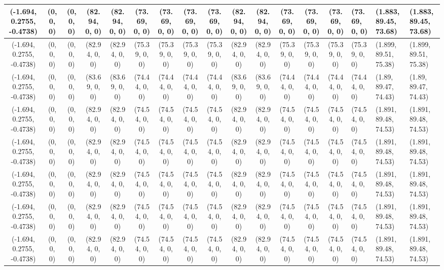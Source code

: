 \begin{tabular}{| c | c | c | c | c | c | c | c | c | c | c | c | c | c |}
	(-1.694, 0.2755, -0.4738) & (0, 0, 0) & (0, 0, 0) & (82.94, 0, 0) & (82.94, 0, 0) & (73.69, 0, 0) & (73.69, 0, 0) & (73.69, 0, 0) & (73.69, 0, 0) & (82.94, 0, 0) & (82.94, 0, 0) & (73.69, 0, 0) & (73.69, 0, 0) & (73.69, 0, 0) & (73.69, 0, 0) & (1.883, 89.45, 73.68) & (1.883, 89.45, 73.68) \\ \hline
	(-1.694, 0.2755, -0.4738) & (0, 0, 0) & (0, 0, 0) & (82.94, 0, 0) & (82.94, 0, 0) & (75.39, 0, 0) & (75.39, 0, 0) & (75.39, 0, 0) & (75.39, 0, 0) & (82.94, 0, 0) & (82.94, 0, 0) & (75.39, 0, 0) & (75.39, 0, 0) & (75.39, 0, 0) & (75.39, 0, 0) & (1.899, 89.51, 75.38) & (1.899, 89.51, 75.38) \\ \hline
	(-1.694, 0.2755, -0.4738) & (0, 0, 0) & (0, 0, 0) & (83.69, 0, 0) & (83.69, 0, 0) & (74.44, 0, 0) & (74.44, 0, 0) & (74.44, 0, 0) & (74.44, 0, 0) & (83.69, 0, 0) & (83.69, 0, 0) & (74.44, 0, 0) & (74.44, 0, 0) & (74.44, 0, 0) & (74.44, 0, 0) & (1.89, 89.47, 74.43) & (1.89, 89.47, 74.43) \\ \hline
	(-1.694, 0.2755, -0.4738) & (0, 0, 0) & (0, 0, 0) & (82.94, 0, 0) & (82.94, 0, 0) & (74.54, 0, 0) & (74.54, 0, 0) & (74.54, 0, 0) & (74.54, 0, 0) & (82.94, 0, 0) & (82.94, 0, 0) & (74.54, 0, 0) & (74.54, 0, 0) & (74.54, 0, 0) & (74.54, 0, 0) & (1.891, 89.48, 74.53) & (1.891, 89.48, 74.53) \\ \hline
	(-1.694, 0.2755, -0.4738) & (0, 0, 0) & (0, 0, 0) & (82.94, 0, 0) & (82.94, 0, 0) & (74.54, 0, 0) & (74.54, 0, 0) & (74.54, 0, 0) & (74.54, 0, 0) & (82.94, 0, 0) & (82.94, 0, 0) & (74.54, 0, 0) & (74.54, 0, 0) & (74.54, 0, 0) & (74.54, 0, 0) & (1.891, 89.48, 74.53) & (1.891, 89.48, 74.53) \\ \hline
	(-1.694, 0.2755, -0.4738) & (0, 0, 0) & (0, 0, 0) & (82.94, 0, 0) & (82.94, 0, 0) & (74.54, 0, 0) & (74.54, 0, 0) & (74.54, 0, 0) & (74.54, 0, 0) & (82.94, 0, 0) & (82.94, 0, 0) & (74.54, 0, 0) & (74.54, 0, 0) & (74.54, 0, 0) & (74.54, 0, 0) & (1.891, 89.48, 74.53) & (1.891, 89.48, 74.53) \\ \hline
	(-1.694, 0.2755, -0.4738) & (0, 0, 0) & (0, 0, 0) & (82.94, 0, 0) & (82.94, 0, 0) & (74.54, 0, 0) & (74.54, 0, 0) & (74.54, 0, 0) & (74.54, 0, 0) & (82.94, 0, 0) & (82.94, 0, 0) & (74.54, 0, 0) & (74.54, 0, 0) & (74.54, 0, 0) & (74.54, 0, 0) & (1.891, 89.48, 74.53) & (1.891, 89.48, 74.53) \\ \hline
	(-1.694, 0.2755, -0.4738) & (0, 0, 0) & (0, 0, 0) & (82.94, 0, 0) & (82.94, 0, 0) & (74.54, 0, 0) & (74.54, 0, 0) & (74.54, 0, 0) & (74.54, 0, 0) & (82.94, 0, 0) & (82.94, 0, 0) & (74.54, 0, 0) & (74.54, 0, 0) & (74.54, 0, 0) & (74.54, 0, 0) & (1.891, 89.48, 74.53) & (1.891, 89.48, 74.53) \\ \hline

\end{tabular}
